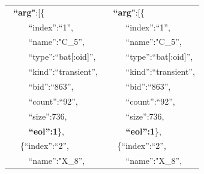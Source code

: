 \documentclass[conference]{IEEEtran}
\begin{document}
\begin{figure}[t]
{\begin{tabular}{|l@{~}l|}
 ~\textbf{``arg"}:[\{                                     &   ~ \textbf{``arg"}:[\{                                      \\
 ~~~~   ``index'':``1'',                                  &   ~~~~    ``index'':``1'',                                   \\
 ~~~~   ``name'':"C\_5'',                                 &   ~~~~    ``name'':"C\_5'',                                  \\
 ~~~~   ``type'':``bat[:oid]'',                           &   ~~~~    ``type'':``bat[:oid]'',                            \\
 ~~~~   ``kind'':``transient'',                           &   ~~~~    ``kind'':``transient'',                            \\
 ~~~~   ``bid'':``863'',                                  &   ~~~~    ``bid'':``863'',                                   \\
 ~~~~   ``count'':``92'',                                 &   ~~~~    ``count'':``92'',                                  \\
 ~~~~   ``size'':736,                                     &   ~~~~    ``size'':736,                                      \\
 ~~~~   \textbf{``eol'':1}\},                             &   ~~~~    \textbf{``eol'':1}\},                              \\
 ~~  \{``index'':``2'',                                   &   ~~   \{``index'':``2'',                                    \\
 ~~~~   ``name'':"X\_8'',                                 &   ~~~~    ``name'':"X\_8'',                                  \\

\end{tabular}}
\end{figure}
\end{document}
